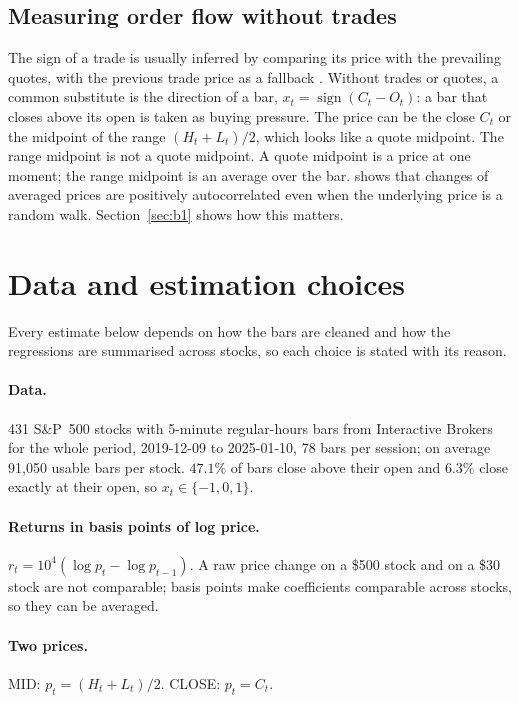 \documentclass[11pt,a4paper]{article}
\begin{document}
\subsection{Measuring order flow without trades}

The sign of a trade is usually inferred by comparing its price with the prevailing quotes, with the
previous trade price as a fallback \citep{lee1991}. Without trades or quotes, a common substitute is the
direction of a bar, $x_t = \operatorname{sign}(C_t-O_t)$: a bar that closes above its open is taken as
buying pressure. The price can be the close $C_t$ or the midpoint of the range $(H_t+L_t)/2$, which looks like a quote midpoint. The range midpoint is not a quote midpoint. A quote midpoint is a price at one moment; the range midpoint is an
average over the bar. \citet{working1960} shows that changes of averaged prices are positively
autocorrelated even when the underlying price is a random walk. Section~\ref{sec:b1} shows how this
matters.

\section{Data and estimation choices}
\label{sec:data}

Every estimate below depends on how the bars are cleaned and how the regressions are summarised across stocks, so each choice is stated with its reason.


\paragraph{Data.} 431 S\&P~500 stocks with 5-minute regular-hours bars from Interactive Brokers for
the whole period, 2019-12-09 to 2025-01-10, 78 bars per session; on average 91{,}050 usable bars per
stock. $47.1\%$ of bars close above their open and $6.3\%$ close exactly at their open, so
$x_t\in\{-1,0,1\}$.

\paragraph{Returns in basis points of log price.} $r_t = 10^4(\log p_t-\log p_{t-1})$. A raw price
change on a \$500 stock and on a \$30 stock are not comparable; basis points make coefficients
comparable across stocks, so they can be averaged.

\paragraph{Two prices.} MID: $p_t=(H_t+L_t)/2$. CLOSE: $p_t=C_t$.
\end{document}
